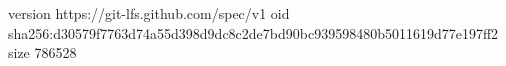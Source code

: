 version https://git-lfs.github.com/spec/v1
oid sha256:d30579f7763d74a55d398d9dc8c2de7bd90bc939598480b5011619d77e197ff2
size 786528
